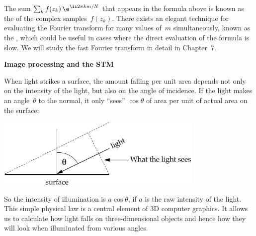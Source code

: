 \documentclass[12pt]{article}
\begin{document}
\begin{exercises}
The sum $\sum_k f(z_k)\,\e^{\ii2\pi km/N}$ that appears in the formula
above is known as the  of the complex
samples~$f(z_k)$.  There exists an elegant technique for evaluating the
Fourier transform for many values of~$m$ simultaneously, known as the
, which could be useful in cases where the
direct evaluation of the formula is slow.  We will study the fast Fourier
transform in detail in Chapter~7.




\exercise \textbf{Image processing and the STM}

\exskip When light strikes a surface, the amount falling per unit area
depends not only on the intensity of the light, but also on the angle of
incidence.  If the light makes an angle~$\theta$ to the normal, it only
``sees'' $\cos\theta$ of area per unit of actual area on the surface:
\bigskip
\begin{center}
\includegraphics[width=10cm]{light.eps}
\end{center}
\medskip
So the intensity of illumination is $a\cos\theta$, if $a$ is the raw
intensity of the light.  This simple physical law is a central element of
3D computer graphics.  It allows us to calculate how light falls on
three-dimensional objects and hence how they will look when illuminated
from various angles.


\end{exercises}
\end{document}
